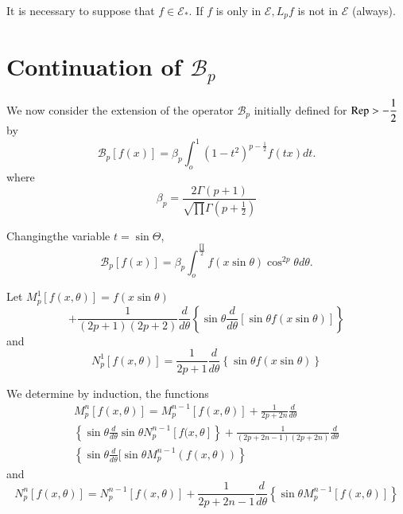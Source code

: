 \begin{remark*}
  It is necessary to suppose that $f \in \mathscr{E}_*$. If $f$ is
  only in $\mathscr{E}, L_p f$ is not in $\mathscr{E}$ (always). 
\end{remark*}

\section{Continuation of $\mathscr{B}_p$}\label{part1:chap3:sec3}%

We now consider the extension of the operator $\mathscr{B}_p$
initially defined for $\operatorname{Rep}  > - \dfrac{1}{2}$ by  
\begin{equation*} 
  \mathscr{B}_p [f(x)] = \beta_p \int^1_o (1-t^2) ^{p- \frac{1}{2}}
  f(tx) dt. \tag{I}\label{part1:chap3:sec3:eqI}
\end{equation*}
  where
  $$
  \beta_p = \frac{2 \Gamma (p+1)}{\sqrt{\prod} \Gamma (p+
    \frac{1}{2})}
  $$

Changing\pageoriginale the variable $t= \sin \Theta$,
$$
\mathscr{B}_p [f (x)] = \beta_p  \int^{\frac{\prod}{2}}_o f(x \sin \theta)
\cos^{2p} \theta d \theta.  
$$

Let $M^1_p [f(x, \theta)] = f(x \sin \theta)$
$$
+ \frac{1}{(2p +1) (2p+2)} \frac{d}{d \theta} \left\{ \sin \theta
\frac{d}{d \theta}[\sin \theta f ( x \sin \theta )] \right\} 
$$
and
$$
N^1_p [ f (x, \theta )] = \frac{1}{2p+1} \frac{d}{d \theta } \left\{
\sin \theta  f(x \sin \theta ) \right\} 
$$

We determine by induction, the functions
\begin{multline*}
  M^n_p [f(x, \theta  )] = M^{n-1}_p [f(x, \theta  )] +  \frac{1}{2p
    +2n} \frac{d}{d \theta  }\\ 
  \left\{\sin \theta  \frac{d}{ d \theta }
  \sin \theta  N^{n-1}_p [f(x, \theta  ] \right\}  
  +  \frac{1}{(2p+ 2n-1)(2p + 2n)} \frac{d}{d \theta }\\ \left\{ \sin
  \theta  \frac{d}{d \theta } [\sin \theta  M^{n-1}_p (f(x, \theta 
    ))\right\} 
\end{multline*}
and 
$$
N^n_p [f(x, \theta )] = N^{n-1}_p [ f(x, \theta ) ] +  \frac{1}{2p+
  2n-1} \frac{d}{d \theta } \left\{ \sin \theta  M^{n-1}_p [f (x, \theta 
  )] \right\} 
$$

